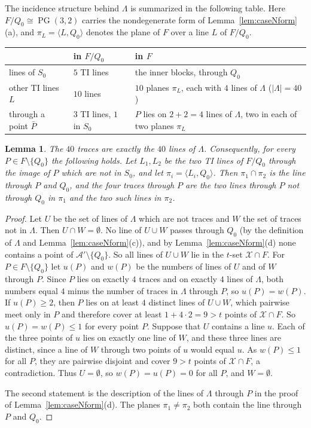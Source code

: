 \documentclass[11pt]{amsart}
\newtheorem{lemma}[theorem]{Lemma}
\theoremstyle{definition}
\newcommand{\X}{\mathcal{X}}
\newcommand{\A}{\mathcal{A}}
\newcommand{\PG}{\operatorname{PG}}
\begin{document}
The incidence structure behind $\Lambda$ is summarized in the following table. Here $F/Q_0\cong\PG(3,2)$ carries the nondegenerate form of Lemma~\ref{lem:caseNform}(a), and $\pi_L=\langle L,Q_0\rangle$ denotes the plane of $F$ over a line $L$ of $F/Q_0$.
\begin{center}\small
\begin{tabular}{@{}lll@{}}
 & in $F/Q_0$ & in $F$\\\hline
lines of $S_0$ & $5$ TI lines & the inner blocks, through $Q_0$\\
other TI lines $L$ & $10$ lines & $10$ planes $\pi_L$, each with $4$ lines of $\Lambda$ \textup{(}$|\Lambda|=40$\textup{)}\\
through a point $\bar P$ & $3$ TI lines, $1$ in $S_0$ & $P$ lies on $2+2=4$ lines of $\Lambda$, two in each of two planes $\pi_L$
\end{tabular}
\end{center}

\begin{lemma}\label{lem:cosets}
The $40$ traces are exactly the $40$ lines of $\Lambda$. Consequently, for every $P\in F\setminus\{Q_0\}$ the following holds. Let $L_1,L_2$ be the two TI lines of $F/Q_0$ through the image of $P$ which are not in $S_0$, and let $\pi_i=\langle L_i,Q_0\rangle$. Then $\pi_1\cap\pi_2$ is the line through $P$ and $Q_0$, and the four traces through $P$ are the two lines through $P$ not through $Q_0$ in $\pi_1$ and the two such lines in $\pi_2$.
\end{lemma}
\begin{proof}
Let $U$ be the set of lines of $\Lambda$ which are not traces and $W$ the set of traces not in $\Lambda$. Then $U\cap W=\emptyset$. No line of $U\cup W$ passes through $Q_0$ (by the definition of $\Lambda$ and Lemma~\ref{lem:caseNform}(c)), and by Lemma~\ref{lem:caseNform}(d) none contains a point of $\A'\setminus\{Q_0\}$. So all lines of $U\cup W$ lie in the $t$-set $\X\cap F$. For $P\in F\setminus\{Q_0\}$ let $u(P)$ and $w(P)$ be the numbers of lines of $U$ and of $W$ through $P$. Since $P$ lies on exactly $4$ traces and on exactly $4$ lines of $\Lambda$, both numbers equal $4$ minus the number of traces in $\Lambda$ through $P$, so $u(P)=w(P)$. If $u(P)\ge2$, then $P$ lies on at least $4$ distinct lines of $U\cup W$, which pairwise meet only in $P$ and therefore cover at least $1+4\cdot2=9>t$ points of $\X\cap F$. So $u(P)=w(P)\le1$ for every point $P$. Suppose that $U$ contains a line $u$. Each of the three points of $u$ lies on exactly one line of $W$, and these three lines are distinct, since a line of $W$ through two points of $u$ would equal $u$. As $w(P)\le1$ for all $P$, they are pairwise disjoint and cover $9>t$ points of $\X\cap F$, a contradiction. Thus $U=\emptyset$, so $w(P)=u(P)=0$ for all $P$, and $W=\emptyset$.

The second statement is the description of the lines of $\Lambda$ through $P$ in the proof of Lemma~\ref{lem:caseNform}(d). The planes $\pi_1\ne\pi_2$ both contain the line through $P$ and $Q_0$.
\end{proof}
\end{document}
